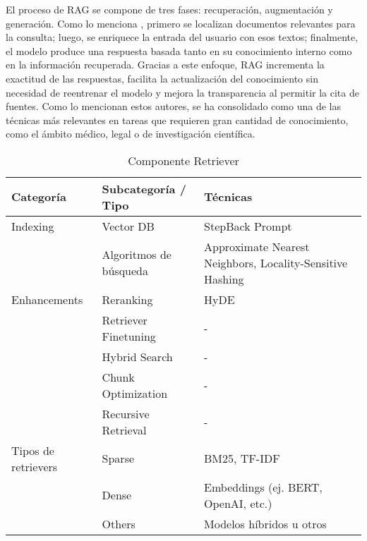 El proceso de RAG se compone de tres fases: recuperación, augmentación y generación. Como lo menciona \textcite{gao2023rag}, primero se 
localizan documentos relevantes para la consulta; luego, se enriquece la entrada del usuario con esos textos; finalmente, el modelo produce 
una respuesta basada tanto en su conocimiento interno como en la información recuperada. Gracias a este enfoque, RAG incrementa la exactitud 
de las respuestas, facilita la actualización del conocimiento sin necesidad de reentrenar el modelo y mejora la transparencia al permitir la 
cita de fuentes. Como lo mencionan estos autores, se ha consolidado como una de las técnicas más relevantes en tareas que requieren gran 
cantidad de conocimiento, como el ámbito médico, legal o de investigación científica.  


\begin{table}[H]
\centering
\begin{tabularx}{\textwidth}{|l|l|X|}
\hline
\textbf{Categoría} & \textbf{Subcategoría / Tipo} & \textbf{Técnicas} \\ \hline
Indexing & Vector DB & StepBack Prompt \\ \hline
         & Algoritmos de búsqueda & Approximate Nearest Neighbors, Locality-Sensitive Hashing \\ \hline
Enhancements & Reranking & HyDE \\ \hline
             & Retriever Finetuning & - \\ \hline
             & Hybrid Search & - \\ \hline
             & Chunk Optimization & - \\ \hline
             & Recursive Retrieval & - \\ \hline
Tipos de retrievers & Sparse & BM25, TF-IDF \\ \hline
                    & Dense & Embeddings (ej. BERT, OpenAI, etc.) \\ \hline
                    & Others & Modelos híbridos u otros \\ \hline
\end{tabularx}
\caption{Componente Retriever}
\end{table}



